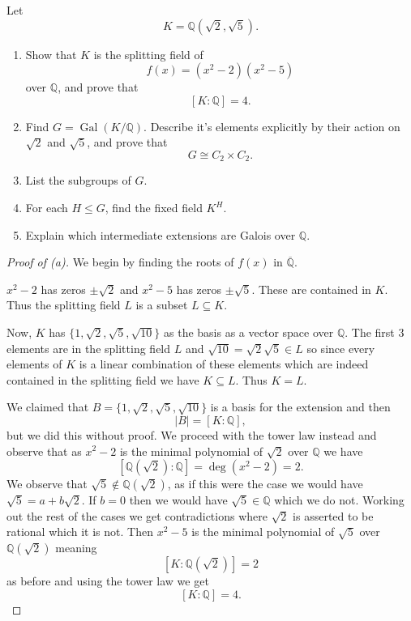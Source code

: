 \begin{prob}
    Let 
    \[
        K = \mathbb Q(\sqrt 2, \sqrt 5). 
    \]
    \begin{enumerate}
        \item Show that $K$ is the splitting field of 
            \[
                f(x) = (x^2 - 2)(x^2-5)
            \]
            over $\mathbb Q$, and prove that 
            \[
                [K:\mathbb Q] = 4. 
            \]
        \item Find $G = \operatorname{Gal}(K/\mathbb Q)$. 
            Describe it's elements explicitly by their 
            action on $\sqrt 2$ and $\sqrt 5$, and prove 
            that 
            \[
                G \cong C_2 \times C_2.
            \]
        \item List the subgroups of $G$.
        \item For each $H \leq G$, find the 
            fixed field $K^H$.
        \item Explain which intermediate extensions 
            are Galois over $\mathbb Q$.
    \end{enumerate}
\end{prob}
\begin{proof}[Proof of (a)]
    We begin by finding the roots of 
    $f(x)$ in $\overline{\mathbb Q}$.

    $x^2 - 2$ has zeros 
    $\pm \sqrt 2$ and $x^2 - 5$ has zeros 
    $\pm \sqrt 5$.
    These are contained in $K$. 
    Thus the splitting field 
    $L$ is a subset $L \subseteq K$. 

    Now, $K$ has $\{1,\sqrt 2, \sqrt 5, \sqrt{10}\}$ 
    as the basis as a vector space over 
    $\mathbb Q$. The first $3$ elements are 
    in the splitting field $L$ and $\sqrt{10} = \sqrt 2 \sqrt 5 \in L$ 
    so since every elements of $K$ is a linear combination 
    of these elements which are indeed contained in 
    the splitting field we have $K \subseteq L$. 
    Thus $K = L$.

    We claimed that $B = \{1,\sqrt 2, \sqrt 5, \sqrt{10}\}$ 
    is a basis for the extension and then 
    \[
        |B| = [K : \mathbb Q], 
    \]
    but we did this without proof. 
    We proceed with the tower law instead 
    and observe that as $x^2 - 2$ is the minimal 
    polynomial of $\sqrt 2$ over $\mathbb Q$ we have 
    \[
        [\mathbb Q(\sqrt 2) : \mathbb Q] = \deg (x^2 - 2) = 2. 
    \]
    We observe that $\sqrt 5 \not\in \mathbb Q(\sqrt 2)$, as 
    if this were the case we would have 
    $\sqrt 5 = a + b\sqrt 2$. If $b = 0$ then 
    we would have $\sqrt 5 \in \mathbb Q$ which 
    we do not. Working out the rest of the 
    cases we get contradictions where $\sqrt 2$ 
    is asserted to be rational which it is not. 
    Then $x^2 - 5$ is the minimal polynomial 
    of $\sqrt 5$ over $\mathbb Q(\sqrt 2)$ meaning 
    \[
        [K : \mathbb Q(\sqrt 2)] = 2 
    \]
    as before and using the tower law we get 
    \[
        [K : \mathbb Q] = 4.
    \]
\end{proof}

